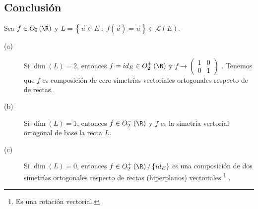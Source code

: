 \subsection*{Conclusión}
\begin{observation}
\normalfont 
Sea $\displaystyle f \in O_{2}\left(\R\right) $ y $\displaystyle L = \left\{ \vec{u} \in E \; : \; f\left(\vec{u}\right) = \vec{u}\right\} \in \mathcal{L}\left(E\right) $. 
\begin{description}
	\item[(a)] Si $\displaystyle \dim\left(L\right) = 2 $, entonces $\displaystyle f = id _{E} \in O^{+}_{2}\left(\R\right) $ y $\displaystyle f \to \begin{pmatrix} 1 & 0 \\ 0 & 1 \end{pmatrix} $ . Tenemos que $\displaystyle f $ es composición de cero simetrías vectoriales ortogonales respecto de de rectas.
	\item[(b)] Si $\displaystyle \dim\left(L\right) = 1 $, entonces $\displaystyle f \in O^{-}_{2}\left(\R\right) $ y $\displaystyle f $ es la simetría vectorial ortogonal de base la recta $\displaystyle L $.
	\item[(c)] Si $\displaystyle \dim\left(L\right) = 0 $, entonces $\displaystyle f \in O^{+}_{2}\left(\R\right) / \left\{ id _{E}\right\} $ es una composición de dos simetrías ortogonales respecto de rectas (hiperplanos) vectoriales \footnote{Es una rotación vectorial.} .
\end{description}
\end{observation}
